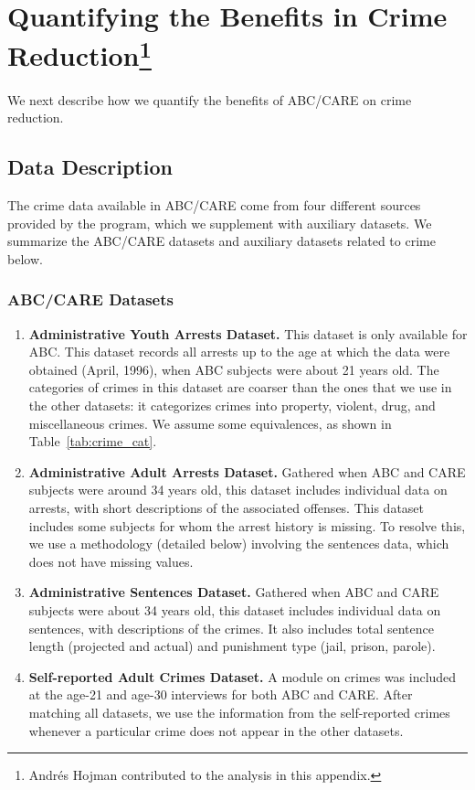 \section{Quantifying the Benefits in Crime Reduction\footnote{Andr\'{e}s Hojman contributed to the analysis in this appendix.}} \label{appendix:crime}

We next describe how we quantify the benefits of ABC/CARE on crime reduction.

\subsection{Data Description}
\label{appendix:crime-data-description}

\noindent The crime data available in ABC/CARE come from four different sources provided by the program, which we supplement with auxiliary datasets. We summarize the ABC/CARE datasets and auxiliary datasets related to crime below.

\subsubsection{ABC/CARE Datasets}
\begin{enumerate}
\item \textbf{Administrative Youth Arrests Dataset.}  This dataset is only available for ABC. This dataset records all arrests up to the age at which the data were obtained (April, 1996), when ABC subjects were about 21 years old. The categories of crimes in this dataset are coarser than the ones that we use in the other datasets: it categorizes crimes into property, violent, drug, and miscellaneous crimes. We assume some equivalences, as shown in Table~\ref{tab:crime_cat}.
\item \textbf{Administrative Adult Arrests Dataset.} Gathered when ABC and CARE subjects were around 34 years old, this dataset includes individual data on arrests, with short descriptions of the associated offenses. This dataset includes some subjects for whom the arrest history is missing. To resolve this, we use a methodology (detailed below) involving the sentences data, which does not have missing values.
\item \textbf{Administrative Sentences Dataset.} Gathered when ABC and CARE subjects were about 34 years old, this dataset includes individual data on sentences, with descriptions of the crimes. It also includes total sentence length (projected and actual) and punishment type (jail, prison, parole).
\item \textbf{Self-reported Adult Crimes Dataset.} A module on crimes was included at the age-21 and age-30 interviews for both ABC and CARE. After matching all datasets, we use the information from the self-reported crimes whenever a particular crime does not appear in the other datasets.
\end{enumerate}


